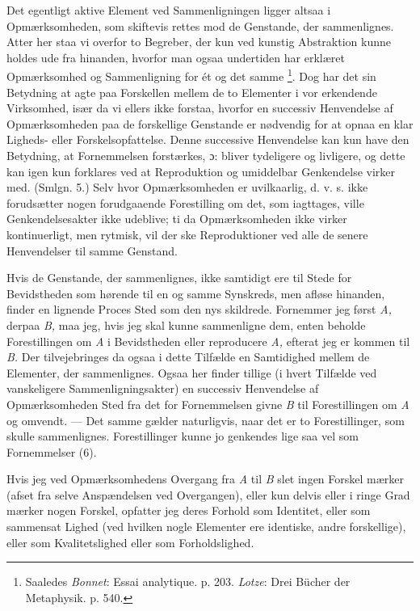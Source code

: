 \documentclass[12pt,a4paper,openany]{book}
\newcommand{\opage}[1]{\marginnote{\footnotesize\textit{[#1]}}}
\begin{document}
Det egentligt aktive Element ved Sammenligningen ligger altsaa i
Opmærksomheden, som skiftevis rettes mod de Genstande, der sammenlignes. Atter
her staa vi overfor to Begreber, der kun ved kunstig Abstraktion kunne holdes
ude fra hinanden, hvorfor man ogsaa undertiden har erklæret Opmærksomhed og
Sammenligning for ét og det samme%
\footnote[2]{Saaledes \emph{Bonnet}: Essai analytique. p. 203. \emph{Lotze}:
Drei Bücher der Metaphysik. p. 540.}. Dog har det sin Betydning at agte paa
Forskellen mellem de to Elementer i vor erkendende Virksomhed, især da vi
ellers ikke forstaa, hvorfor en successiv Henvendelse af Opmærksomheden paa de
forskellige Genstande er nødvendig for at opnaa en klar Ligheds- eller
Forskelsopfattelse. Denne successive Henvendelse kan kun have den Betydning, at
Fornemmelsen forstærkes, ɔ: bliver tydeligere og livligere, og dette kan igen
kun forklares ved at Reproduktion og umiddelbar Genkendelse virker med. (Smlgn.
5.) Selv hvor Opmærksomheden er uvilkaarlig, d. v. s. ikke forudsætter nogen
forudgaaende Forestilling om det, som iagttages, ville Genkendelsesakter ikke
udeblive; ti da Opmærksomheden ikke virker kontinuerligt, men rytmisk, vil der
ske Reproduktioner ved alle de senere Henvendelser til samme Genstand.

\setcounter{footnote}{0}%
\opage{62}Hvis de Genstande, der sammenlignes, ikke samtidigt ere til Stede for
Bevidstheden som hørende til en og samme Synskreds, men afløse hinanden, finder
en lignende Proces Sted som den nys skildrede. Fornemmer jeg først \textit{A,}
derpaa \textit{B,} maa jeg, hvis jeg skal kunne sammenligne dem, enten beholde
Forestillingen om \textit{A} i Bevidstheden eller reproducere \textit{A,}
efterat jeg er kommen til \textit{B.} Der tilvejebringes da ogsaa i dette
Tilfælde en Samtidighed mellem de Elementer, der sammenlignes. Ogsaa her finder
tillige (i hvert Tilfælde ved vanskeligere Sammenligningsakter) en successiv
Henvendelse af Opmærksomheden Sted fra det for Fornemmelsen givne \textit{B}
til Forestillingen om \textit{A} og omvendt. --- Det samme gælder naturligvis,
naar det er to Forestillinger, som skulle sammenlignes. Forestillinger kunne jo
genkendes lige saa vel som Fornemmelser (6).

Hvis jeg ved Opmærksomhedens Overgang fra \textit{A} til \textit{B} slet ingen
Forskel mærker (afset fra selve Anspændelsen ved Overgangen), eller kun delvis
eller i ringe Grad mærker nogen Forskel, opfatter jeg deres Forhold som
Identitet, eller som sammensat Lighed (ved hvilken nogle Elementer ere
identiske, andre forskellige), eller som Kvalitetslighed eller som Forholdslighed.
\end{document}
